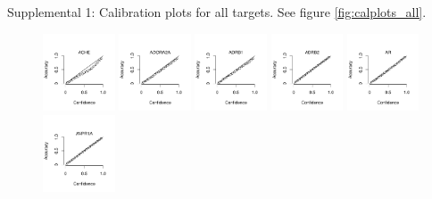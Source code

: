 \documentclass[utf8]{frontiersSCNS} %
\begin{document}
Supplemental 1: Calibration plots for all targets. See figure
\ref{fig:calplots_all}.

\begin{figure}[h!]

\vspace*{-15pt} %
\includegraphics[width=0.19\textwidth]{figures/calibration_plots/ache_calib.pdf}
\includegraphics[width=0.19\textwidth]{figures/calibration_plots/adora2a_calib.pdf}
\includegraphics[width=0.19\textwidth]{figures/calibration_plots/adrb1_calib.pdf}
\includegraphics[width=0.19\textwidth]{figures/calibration_plots/adrb2_calib.pdf}
\includegraphics[width=0.19\textwidth]{figures/calibration_plots/ar_calib.pdf}
\vspace*{-15pt} %
\includegraphics[width=0.19\textwidth]{figures/calibration_plots/avpr1a_calib.pdf}

\end{figure}
\end{document}

